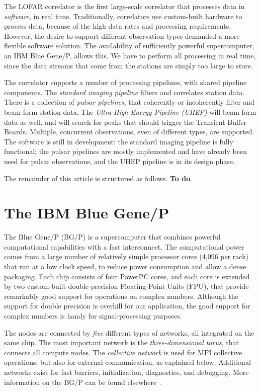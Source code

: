 The LOFAR correlator is the first large-scale correlator that processes
data in \emph{software}, in real time.
Traditionally, correlators use custom-built hardware to process data, because
of the high data rates and processing requirements.
However, the desire to support different observation types demanded a more
flexible software solution.
The availability of sufficiently powerful supercomputer, an IBM Blue Gene/P,
allows this.
We have to perform all processing in real time, since the data streams
that come from the stations are simply too large to store.

The correlator supports a number of processing pipelines, with shared pipeline
components.
The \emph{standard imaging pipeline\/} filters and correlates station data.
There is a collection of \emph{pulsar pipelines}, that coherently or
incoherently filter and beam form station data.
The \emph{Ultra-High Energy Pipeline (UHEP)\/} will beam form data as well, and
will search for peaks that should trigger the Transient Buffer Boards.
Multiple, concurrent observations, even of different types, are supported.
The software is still in development: the standard imaging pipeline is fully
functional; the pulsar pipelines are mostly implemented and have already
been used for pulsar observations, and the UHEP pipeline is in its design
phase.

The remainder of this article is structured as follows.
\textbf{To do}.%


\section{The IBM Blue Gene/P}

The Blue Gene/P (BG/P) is a supercomputer that combines powerful computational
capabilities with a fast interconnect.
The computational power comes from a large number of relatively simple
processor cores (4,096 per rack) that run at a low clock speed, to reduce
power consumption and allow a dense packaging.
Each chip consists of four PowerPC cores, and each core is extended by
two custom-built double-precision Floating-Point Units (FPU), that provide
remarkably good support for operations on complex numbers.
Although the support for double precision is overkill for our application,
the good support for complex numbers is handy for signal-processing purposes.

The nodes are connected by \emph{five\/} different types of networks,
all integrated on the same chip.
The most important network is the \emph{three-dimensional torus}, that
connects all compute nodes.
The \emph{collective network\/} is used for MPI collective operations,
but also for external communication, as explained below.
Additional networks exist for fast barriers, initialization, diagnostics, and
debugging.
More information on the BG/P can be found elsewhere~\cite{IBM:08}.

